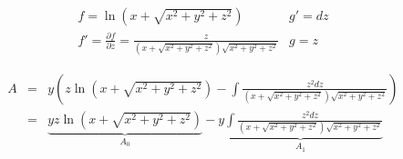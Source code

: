 \[
\begin{array}{c|c}
  f=\ln{ \left( x + \sqrt{x^2+y^2+z^2} \right)} & 
  g'=dz \\ 
  \hline
  f' = \frac{\partial f}{\partial z} = \frac{z}{\left( x+\sqrt{x^2+y^2+z^2} \right) \sqrt{x^2+y^2+z^2}} 
  & g = z
 \end{array}
\]

\begin{eqnarray}
A 
&=& 
y \left(z \ln{ \left( x + \sqrt{x^2+y^2+z^2} \right)} - 
\int \frac{z^2 dz}{\left( x+\sqrt{x^2+y^2+z^2} \right) \sqrt{x^2+y^2+z^2}} \right) \nonumber\\
&=& 
\underbrace{yz \ln{ \left( x + \sqrt{x^2+y^2+z^2} \right)} }_{A_0} 
- 
\underbrace{y\int \frac{z^2 dz}{\left( x+\sqrt{x^2+y^2+z^2} \right) \sqrt{x^2+y^2+z^2}}  }_{A_1}
\end{eqnarray}


